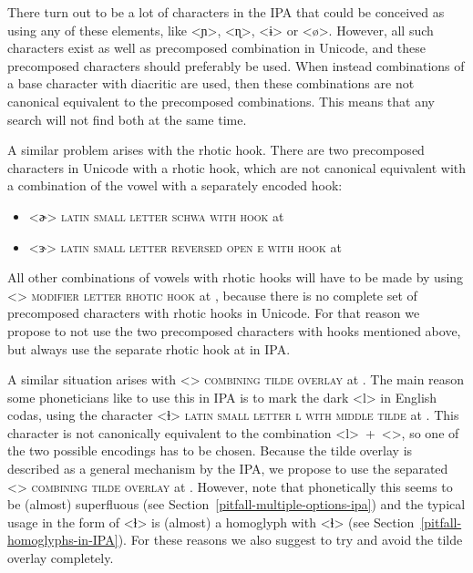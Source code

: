 There turn out to be a lot of characters in the IPA that could be conceived as
using any of these elements, like <ɲ>, <ɳ>, <ɨ> or <ø>. However, all such
characters exist as well as precomposed combination in Unicode, and these
precomposed characters should preferably be used. When instead combinations of a base character with
diacritic are used, then these combinations are not canonical equivalent to the
precomposed combinations. This means that any search will not find both at the
same time.


A similar problem arises with the rhotic hook. There are two precomposed
characters in Unicode with a rhotic hook, which are not canonical equivalent 
with a combination of the vowel with a separately encoded hook:
\begin{itemize}
  \item[] <ɚ> \textsc{latin small letter schwa with hook} at 
  \item[] <ɝ> \textsc{latin small letter reversed open e with hook} at 
\end{itemize}
All other combinations of vowels with rhotic hooks will have to be made by using
<> \textsc{modifier letter rhotic hook} at , because there
is no complete set of precomposed characters with rhotic hooks in Unicode. For
that reason we propose to not use the two precomposed characters with hooks
mentioned above, but always use the separate rhotic hook at  in IPA.\@

A similar situation arises with <> \textsc{combining tilde overlay} at
. The main reason some phoneticians like to use this in IPA is to mark
the dark <l> in English codas, using the character <ɫ> \textsc{latin small
letter l with middle tilde} at . This character is not canonically
equivalent to the combination <l>~+~<>, so one of the two possible
encodings has to be chosen. Because the tilde overlay is described as a general
mechanism by the IPA, we propose to use the separated <>
\textsc{combining tilde overlay} at . However, note that phonetically 
this seems to be (almost) superfluous (see Section~\ref{pitfall-multiple-options-ipa}) 
and the typical usage in the form of <ɫ> is (almost) a homoglyph with <ɬ> (see 
Section~\ref{pitfall-homoglyphs-in-IPA}). For these reasons we also suggest to try 
and avoid the tilde overlay completely.

